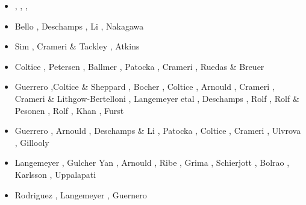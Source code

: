 \begin{itemize}
\begin{scriptsize}
\begin{itemize}
                            \cite{nata13}\cite{mowe13},
\item[\twothousandfourteen] \cite{yadl14}\cite{crta14},
                            \cite{roct14}\cite{cort14},
                            \cite{becr14}\cite{lidt14},
                            \cite{robg14}\cite{nata14}
\item[\twothousandfifteen] Bello \etal \cite{bect15}, Deschamps \etal \cite{delt15},
                           Li \etal \cite{lidt15}, Nakagawa \etal \cite{nani15}
\item[\twothousandsixteen] Sim \etal \cite{sisc16}, Crameri \& Tackley \cite{crta16}, 
                           Atkins \etal \cite{atvt16}
\item[\twothousandseventeen] Coltice \etal \cite{cogu17}, Petersen \etal \cite{pest17}, 
                             Ballmer \etal \cite{bahh17}, Patocka \etal \cite{pact17}, 
                             Crameri \etal \cite{crlt17}, Ruedas \& Breuer \cite{rubr17} 
\item[\twothousandeighteen] Guerrero \etal \cite{guld18},Coltice \& Sheppard \cite{cosh18}, 
                            Bocher \etal \cite{bofc18}, Coltice \etal \cite{cold18}, 
                            Arnould \etal \cite{arcf18}, Crameri \cite{cram18}, 
                            Crameri \& Lithgow-Bertelloni \cite{crli18}, Langemeyer etal \cite{lalt18}, 
                            Deschamps \etal \cite{dert18}, Rolf \etal \cite{ross18},
                            Rolf \& Pesonen \cite{rope18}, Rolf \etal \cite{roct18},
                            Khan \etal \cite{khlr18}, Furst \etal \cite{fupc18}
\item[\twothousandnineteen] Guerrero \etal \cite{gult19}, Arnould \etal \cite{argc19},
                            Deschamps \& Li \cite{deli19}, Patocka \etal \cite{pact19},
                            Coltice \etal \cite{cohf19}, Crameri \etal \cite{crcm19},
                            Ulvrova \etal \cite{ulcw19}, Gillooly \etal \cite{gicw19}
\item[\twothousandtwenty] Langemeyer \etal \cite{lalt20}, Gulcher \etal \cite{gugb20}
                          Yan \etal \cite{yabt20}, Arnould \etal \cite{arcf20}, 
                          Ribe \etal \cite{rits20}, Grima \etal \cite{grlc20}, 
                          Schierjott \etal \cite{scrt20}, 
                          Bolrao \etal \cite{bobm20}, Karlsson \etal \cite{kacc20},
                          Uppalapati \etal \cite{uprc20}
\item[\twothousandtwentyone] Rodriguez \etal \cite{roac21}, Langemeyer \etal \cite{lalt21},
                             Guernero \etal \cite{gult21}
\end{itemize}
\end{scriptsize}


\end{itemize}
